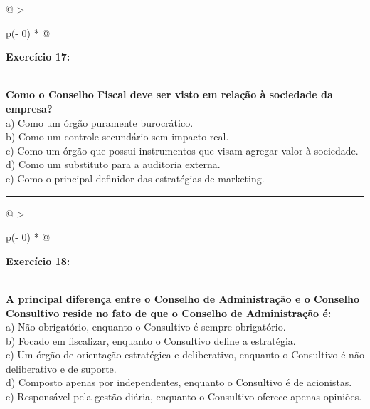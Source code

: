 \documentclass[
]{book}
\begin{document}
\begin{longtable}[]{@{}
  >{\raggedright\arraybackslash}p{(\columnwidth - 0\tabcolsep) * }@{}}
\toprule\noalign{}
\begin{minipage}[b]{\linewidth}\raggedright
\textbf{Exercício 17:}
\end{minipage} \\
\midrule\noalign{}
\endhead
\bottomrule\noalign{}
\endlastfoot
\textbf{Como o Conselho Fiscal deve ser visto em relação à sociedade da empresa?} \\
a) Como um órgão puramente burocrático. \\
b) Como um controle secundário sem impacto real. \\
c) Como um órgão que possui instrumentos que visam agregar valor à sociedade. \\
d) Como um substituto para a auditoria externa. \\
e) Como o principal definidor das estratégias de marketing. \\
\end{longtable}

\begin{center}\rule{0.5\linewidth}{0.5pt}\end{center}

\begin{longtable}[]{@{}
  >{\raggedright\arraybackslash}p{(\columnwidth - 0\tabcolsep) * }@{}}
\toprule\noalign{}
\begin{minipage}[b]{\linewidth}\raggedright
\textbf{Exercício 18:}
\end{minipage} \\
\midrule\noalign{}
\endhead
\bottomrule\noalign{}
\endlastfoot
\textbf{A principal diferença entre o Conselho de Administração e o Conselho Consultivo reside no fato de que o Conselho de Administração é:} \\
a) Não obrigatório, enquanto o Consultivo é sempre obrigatório. \\
b) Focado em fiscalizar, enquanto o Consultivo define a estratégia. \\
c) Um órgão de orientação estratégica e deliberativo, enquanto o Consultivo é não deliberativo e de suporte. \\
d) Composto apenas por independentes, enquanto o Consultivo é de acionistas. \\
e) Responsável pela gestão diária, enquanto o Consultivo oferece apenas opiniões. \\
\end{longtable}
\end{document}

